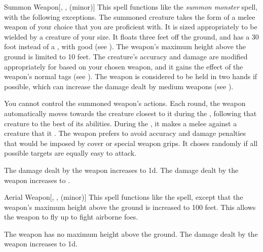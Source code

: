 \lowercase{\hypertarget{spell:Summon Weapon}{}}\label{spell:Summon Weapon}
\begin{freeability}[Rank 3]{\hypertarget{spell:Summon Weapon}{Summon Weapon}}[, ,  (minor)]
This spell functions like the \textit{summon monster} spell, with the following exceptions.
The summoned creature takes the form of a melee weapon of your choice that you are proficient with.
It is sized appropriately to be wielded by a creature of your size.
It floats three feet off the ground, and has a 30 foot  instead of a , with good  (see ).
The weapon's maximum height above the ground is limited to 10 feet.
The creature's accuracy and damage are modified appropriately for based on your chosen weapon, and it gains the effect of the weapon's normal tags (see ).
The weapon is considered to be held in two hands if possible, which can increase the damage dealt by medium weapons (see ).

You cannot control the summoned weapon's actions.
Each round, the weapon automatically moves towards the creature closest to it during the , following that creature to the best of its abilities.
During the , it makes a melee  against a creature that it .
The weapon prefers to avoid accuracy and damage penalties that would be imposed by cover or special weapon grips.
It choses randomly if all possible targets are equally easy to attack.

\rankline
{} The damage dealt by the weapon increases to  \minus1d.
 The damage dealt by the weapon increases to .
\end{freeability}
\vspace{0.25em}



\lowercase{\hypertarget{spell:Aerial Weapon}{}}\label{spell:Aerial Weapon}
\begin{freeability}[Rank 4]{\hypertarget{spell:Aerial Weapon}{Aerial Weapon}}[, ,  (minor)]
This spell functions like the  spell, except that the weapon's maximum height above the ground is increased to 100 feet.
This allows the weapon to fly up to fight airborne foes.

\rankline
{} The weapon has no maximum height above the ground.
 The damage dealt by the weapon increases to  \minus1d.
\end{freeability}
\vspace{0.25em}



